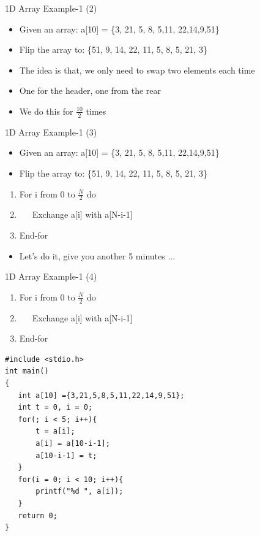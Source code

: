 \begin{frame}{1D Array Example-1 (2)}
	\begin{itemize}
		\item {Given an array: a[10] = \{3, 21, 5, 8, 5,11, 22,14,9,51\}}
		\item {Flip the array to: \{51, 9, 14, 22, 11, 5, 8, 5, 21, 3\}}
	\end{itemize}
	\begin{itemize}
		\item {The idea is that, we only need to swap two elements each time}
		\item {One for the header, one from the rear}
		\item {We do this for $\frac{10}{2}$ times}
	\end{itemize}
\end{frame}

\begin{frame}{1D Array Example-1 (3)}
	\begin{itemize}
		\item {Given an array: a[10] = \{3, 21, 5, 8, 5,11, 22,14,9,51\}}
		\item {Flip the array to: \{51, 9, 14, 22, 11, 5, 8, 5, 21, 3\}}
	\end{itemize}
	\begin{enumerate}
		\item {For i from 0 to $\frac{N}{2}$ do}
		\item {~~~Exchange a[i] with a[N-i-1]}
		\item {End-for}
	\end{enumerate}
	\begin{itemize}
		\item {Let's do it, give you another 5 minutes ...}
	\end{itemize}
\end{frame}

\begin{frame}[fragile]{1D Array Example-1 (4)}
	\begin{enumerate}
		\item {For i from 0 to $\frac{N}{2}$ do}
		\item {~~~Exchange a[i] with a[N-i-1]}
		\item {End-for}
	\end{enumerate}
\begin{lstlisting}[xleftmargin=0.08\linewidth,linewidth=0.9\linewidth]
#include <stdio.h>
int main()
{
   int a[10] ={3,21,5,8,5,11,22,14,9,51};
   int t = 0, i = 0;
   for(; i < 5; i++){
       t = a[i];
       a[i] = a[10-i-1];
       a[10-i-1] = t;
   }
   for(i = 0; i < 10; i++){
       printf("%d ", a[i]);
   }
   return 0;
}
\end{lstlisting}
\end{frame}



